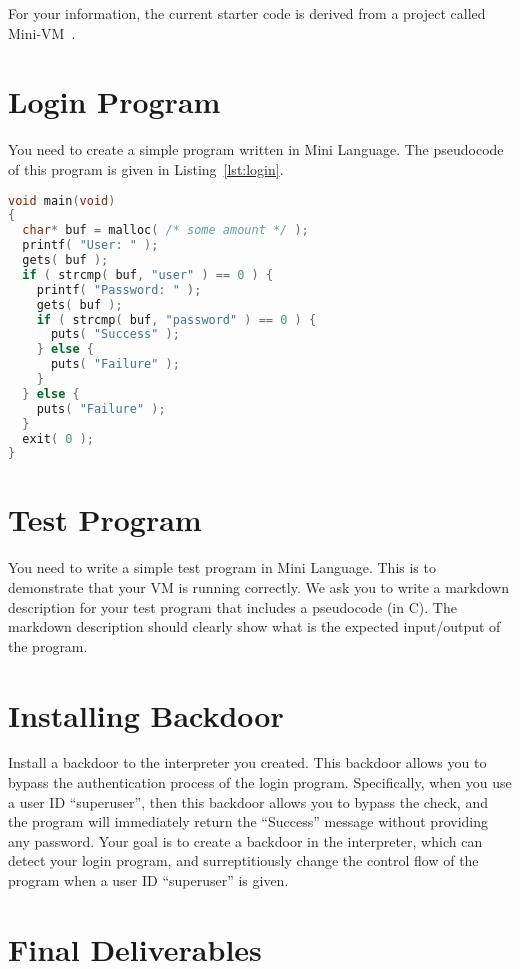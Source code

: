 \documentclass[a4paper, 11pt]{article}
\theoremstyle{definition}
\begin{document}
{For your information, the current starter code is derived from a
project called Mini-VM~\cite{minivm}.

\section{Login Program}

You need to create a simple program written in Mini Language. The
pseudocode of this program is given in Listing~\ref{lst:login}.

\begin{lstlisting}[language=C,
                   caption={Pseudocode for Login Program.},
                   label=lst:login,
                   basicstyle=\footnotesize\ttfamily]
void main(void)
{
  char* buf = malloc( /* some amount */ );
  printf( "User: " );
  gets( buf );
  if ( strcmp( buf, "user" ) == 0 ) {
    printf( "Password: " );
    gets( buf );
    if ( strcmp( buf, "password" ) == 0 ) {
      puts( "Success" );
    } else {
      puts( "Failure" );
    }
  } else {
    puts( "Failure" );
  }
  exit( 0 );
}
\end{lstlisting}

\section{Test Program}

You need to write a simple test program in Mini Language. This is to
demonstrate that your VM is running correctly. We ask you to write a
markdown description for your test program that includes a pseudocode
(in C). The markdown description should clearly show what is the
expected input/output of the program.

\section{Installing Backdoor}

Install a backdoor to the interpreter you created. This backdoor
allows you to bypass the authentication process of the login program.
Specifically, when you use a user ID ``superuser'', then this backdoor
allows you to bypass the check, and the program will immediately
return the ``Success'' message without providing any password. Your
goal is to create a backdoor in the interpreter, which can detect your
login program, and surreptitiously change the control flow of the
program when a user ID ``superuser'' is given.

\section{Final Deliverables}

}
\end{document}
